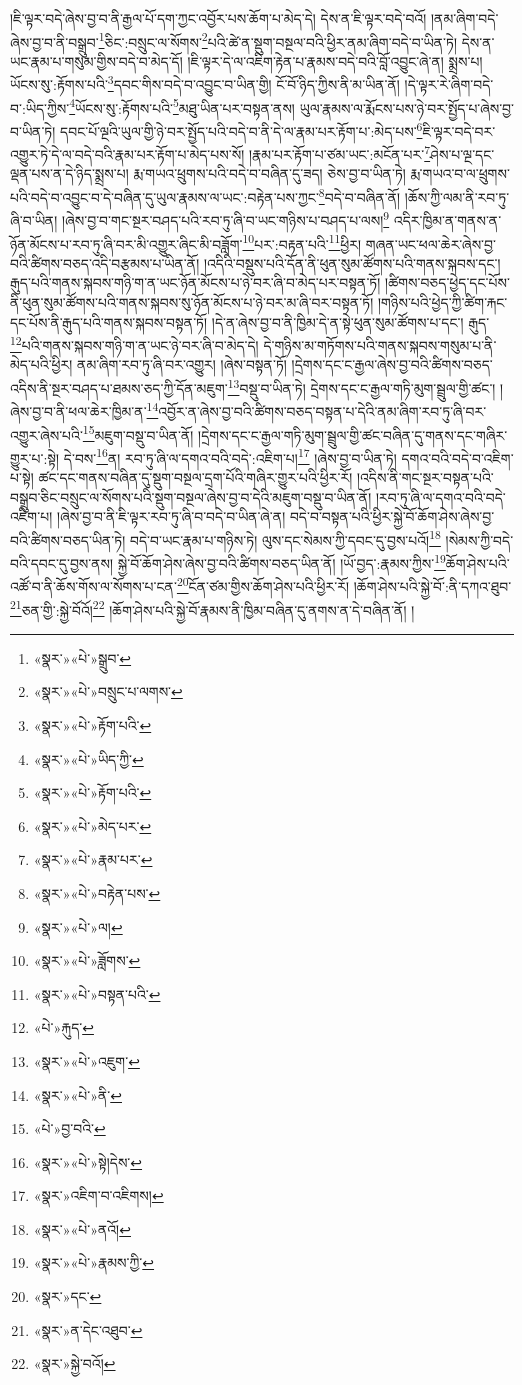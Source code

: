 །ཇི་ལྟར་བདེ་ཞེས་བྱ་བ་ནི་རྒྱལ་པོ་དག་ཀྱང་འབྱོར་པས་ཆོག་པ་མེད་དེ། དེས་ན་ཇི་ལྟར་བདེ་བའོ། །ནམ་ཞིག་བདེ་ཞེས་བྱ་བ་ནི་བསྒྲུབ་\footnote{«སྣར་»«པེ་»སྒྲུབ་}ཅིང་:བསྲུང་ལ་སོགས་\footnote{«སྣར་»«པེ་»བསྲུང་པ་ལགས་}པའི་ཚེ་ན་སྡུག་བསྔལ་བའི་ཕྱིར་ནམ་ཞིག་བདེ་བ་ཡིན་ཏེ། དེས་ན་ཡང་རྣམ་པ་གསུམ་གྱིས་བདེ་བ་མེད་དོ། །ཇི་ལྟར་དེ་ལ་འཇིག་རྟེན་པ་རྣམས་བདེ་བའི་བློ་འབྱུང་ཞེ་ན། སྨྲས་པ། ཡོངས་སུ་:རྟོགས་པའི་\footnote{«སྣར་»«པེ་»རྟོག་པའི་}དབང་གིས་བདེ་བ་འབྱུང་བ་ཡིན་གྱི། ངོ་བོ་ཉིད་ཀྱིས་ནི་མ་ཡིན་ནོ། །དེ་ལྟར་རེ་ཞིག་བདེ་བ་:ཡིད་ཀྱིས་\footnote{«སྣར་»«པེ་»ཡིད་ཀྱི་}ཡོངས་སུ་:རྟོགས་པའི་\footnote{«སྣར་»«པེ་»རྟོག་པའི་}མཐུ་ཡིན་པར་བསྟན་ནས། ཡུལ་རྣམས་ལ་རྨོངས་པས་ཉེ་བར་སྤྱོད་པ་ཞེས་བྱ་བ་ཡིན་ཏེ། དབང་པོ་ལྔའི་ཡུལ་གྱི་ཉེ་བར་སྤྱོད་པའི་བདེ་བ་ནི་དེ་ལ་རྣམ་པར་རྟོག་པ་:མེད་པས་\footnote{«སྣར་»«པེ་»མེད་པར་}ཇི་ལྟར་བདེ་བར་འགྱུར་ཏེ་དེ་ལ་བདེ་བའི་རྣམ་པར་རྟོག་པ་མེད་པས་སོ། །རྣམ་པར་རྟོག་པ་ཙམ་ཡང་:མངོན་པར་\footnote{«སྣར་»«པེ་»རྣམ་པར་}ཤེས་པ་ལྔ་དང་ལྡན་པས་ན་དེ་ཉིད་སྨྲས་པ། རྨ་གཡའ་ཕྲུགས་པའི་བདེ་བ་བཞིན་དུ་ཟད། ཅེས་བྱ་བ་ཡིན་ཏེ། རྨ་གཡའ་བ་ལ་ཕྲུགས་པའི་བདེ་བ་འབྱུང་བ་དེ་བཞིན་དུ་ཡུལ་རྣམས་ལ་ཡང་:བརྟེན་པས་ཀྱང་\footnote{«སྣར་»«པེ་»བརྟེན་པས་}བདེ་བ་བཞིན་ནོ། །ཆོས་ཀྱི་ལམ་ནི་རབ་ཏུ་ཞི་བ་ཡིན། །ཞེས་བྱ་བ་གང་སྔར་བཤད་པའི་རབ་ཏུ་ཞི་བ་ཡང་གཉིས་པ་བཤད་པ་ལས།\footnote{«སྣར་»«པེ་»ལ།} འདིར་ཁྱིམ་ན་གནས་ན་ཉོན་མོངས་པ་རབ་ཏུ་ཞི་བར་མི་འགྱུར་ཞིང་མི་བཟློག་\footnote{«སྣར་»«པེ་»ཟློགས་}པར་:བརྟན་པའི་\footnote{«སྣར་»«པེ་»བསྟན་པའི་}ཕྱིར། གཞན་ཡང་ཕལ་ཆེར་ཞེས་བྱ་བའི་ཚིགས་བཅད་འདི་བརྩམས་པ་ཡིན་ནོ། །འདིའི་བསྡུས་པའི་དོན་ནི་ཕུན་སུམ་ཚོགས་པའི་གནས་སྐབས་དང་། རྒུད་པའི་གནས་སྐབས་གཉི་ག་ན་ཡང་ཉོན་མོངས་པ་ཉེ་བར་ཞི་བ་མེད་པར་བསྟན་ཏོ། །ཚིགས་བཅད་ཕྱེད་དང་པོས་ནི་ཕུན་སུམ་ཚོགས་པའི་གནས་སྐབས་སུ་ཉོན་མོངས་པ་ཉེ་བར་མ་ཞི་བར་བསྟན་ཏོ། །གཉིས་པའི་ཕྱེད་ཀྱི་ཚིག་རྐང་དང་པོས་ནི་རྒུད་པའི་གནས་སྐབས་བསྟན་ཏོ། །དེ་ན་ཞེས་བྱ་བ་ནི་ཁྱིམ་དེ་ན་སྟེ་ཕུན་སུམ་ཚོགས་པ་དང་། རྒུད་\footnote{«པེ་»རྐུད་}པའི་གནས་སྐབས་གཉི་ག་ན་ཡང་ཉེ་བར་ཞི་བ་མེད་དེ། དེ་གཉིས་མ་གཏོགས་པའི་གནས་སྐབས་གསུམ་པ་ནི་མེད་པའི་ཕྱིར། ནམ་ཞིག་རབ་ཏུ་ཞི་བར་འགྱུར། །ཞེས་བསྟན་ཏོ། །དྲེགས་དང་ང་རྒྱལ་ཞེས་བྱ་བའི་ཚིགས་བཅད་འདིས་ནི་སྔར་བཤད་པ་ཐམས་ཅད་ཀྱི་དོན་མཇུག་\footnote{«སྣར་»«པེ་»འཇུག་}བསྡུ་བ་ཡིན་ཏེ། དྲེགས་དང་ང་རྒྱལ་གཏི་མུག་སྦྲུལ་གྱི་ཚང་། །ཞེས་བྱ་བ་ནི་ཕལ་ཆེར་ཁྱིམ་ན་\footnote{«སྣར་»«པེ་»ནི་}འབྱོར་ན་ཞེས་བྱ་བའི་ཚིགས་བཅད་བསྟན་པ་དེའི་ནམ་ཞིག་རབ་ཏུ་ཞི་བར་འགྱུར་ཞེས་པའི་\footnote{«པེ་»བྱ་བའི་}མཇུག་བསྡུ་བ་ཡིན་ནོ། །དྲེགས་དང་ང་རྒྱལ་གཏི་མུག་སྦྲུལ་གྱི་ཚང་བཞིན་དུ་གནས་དང་གཞིར་གྱུར་པ་:སྟེ། དེ་བས་\footnote{«སྣར་»«པེ་»སྟེ།དེས་}ན། རབ་ཏུ་ཞི་ལ་དགའ་བའི་བདེ་:འཇིག་པ།\footnote{«སྣར་»འཇིག་བ་འཇིགས།} །ཞེས་བྱ་བ་ཡིན་ཏེ། དགའ་བའི་བདེ་བ་འཇིག་པ་སྟེ། ཚང་དང་གནས་བཞིན་དུ་སྡུག་བསྔལ་དྲག་པོའི་གཞིར་གྱུར་པའི་ཕྱིར་རོ། །འདིས་ནི་གང་སྔར་བསྟན་པའི་བསྒྲུབ་ཅིང་བསྲུང་ལ་སོགས་པའི་སྡུག་བསྔལ་ཞེས་བྱ་བ་དེའི་མཇུག་བསྡུ་བ་ཡིན་ནོ། །རབ་ཏུ་ཞི་ལ་དགའ་བའི་བདེ་འཇིག་པ། །ཞེས་བྱ་བ་ནི་ཇི་ལྟར་རབ་ཏུ་ཞི་བ་བདེ་བ་ཡིན་ཞེ་ན། བདེ་བ་བསྟན་པའི་ཕྱིར་སྐྱེ་བོ་ཆོག་ཤེས་ཞེས་བྱ་བའི་ཚིགས་བཅད་ཡིན་ཏེ། བདེ་བ་ཡང་རྣམ་པ་གཉིས་ཏེ། ལུས་དང་སེམས་ཀྱི་དབང་དུ་བྱས་པའོ།\footnote{«སྣར་»«པེ་»ནའོ།} །སེམས་ཀྱི་བདེ་བའི་དབང་དུ་བྱས་ནས། སྐྱེ་བོ་ཆོག་ཤེས་ཞེས་བྱ་བའི་ཚིགས་བཅད་ཡིན་ནོ། །ཡོ་བྱད་:རྣམས་ཀྱིས་\footnote{«སྣར་»«པེ་»རྣམས་ཀྱི་}ཆོག་ཤེས་པའི་འཚོ་བ་ནི་ཆོས་གོས་ལ་སོགས་པ་ངན་\footnote{«སྣར་»དང་}ངོན་ཙམ་གྱིས་ཆོག་ཤེས་པའི་ཕྱིར་རོ། །ཆོག་ཤེས་པའི་སྐྱེ་བོ་:ནི་དཀའ་ཐུབ་\footnote{«སྣར་»ན་དེང་འཐུབ་}ཅན་གྱི་:སྐྱེ་བོའོ།\footnote{«སྣར་»སྐྱེ་བའོ།} །ཆོག་ཤེས་པའི་སྐྱེ་བོ་རྣམས་ནི་ཁྱིམ་བཞིན་དུ་ནགས་ན་དེ་བཞིན་ནོ། །
